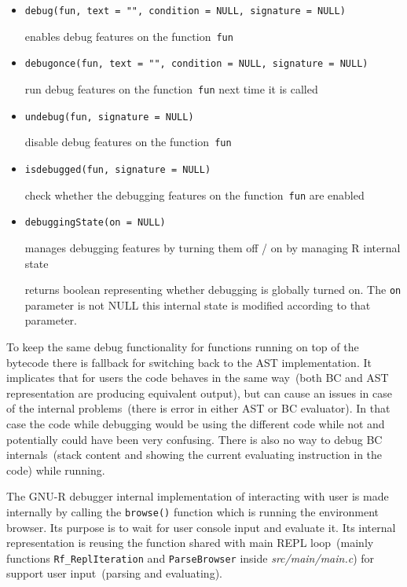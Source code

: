 \documentclass[thesis=M,english]{FITthesis}[2018/10/20]
\newcommand{\code}[1]{\texttt{#1}}
\begin{document}
\begin{itemize}
	\item \code{debug(fun, text = "", condition = NULL, signature = NULL)}

	\hspace*{6mm} enables debug features on the function~\code{fun}
	
	\item \code{debugonce(fun, text = "", condition = NULL, signature = NULL)}

	\hspace*{6mm} run debug features on the function~\code{fun} next time it is called	
	
	\item \code{undebug(fun, signature = NULL)}

	\hspace*{6mm} disable debug features on the function~\code{fun}

	\item \code{isdebugged(fun, signature = NULL)}

	\hspace*{6mm} check whether the debugging features on the function~\code{fun} are enabled

	\item \code{debuggingState(on = NULL)}

	\hspace*{6mm} manages debugging features by turning them off / on by managing R internal state
	
	\hspace*{6mm} returns boolean representing whether debugging is globally turned on. The \code{on} parameter is not NULL this internal state is modified according to that parameter.
	
\end{itemize}

To keep the same debug functionality for functions running on top of the bytecode there is fallback for switching back to the AST implementation. It implicates that for users the code behaves in the same way~(both BC and AST representation are producing equivalent output), but can cause an issues in case of the internal problems~(there is error in either AST or BC evaluator). In that case the code while debugging would be using the different code while not and potentially could have been very confusing. There is also no way to debug BC internals~(stack content and showing the current evaluating instruction in the code) while running.

The GNU-R debugger internal implementation of interacting with user is made internally by calling the \code{browse()} function which is running the environment browser. Its purpose is to wait for user console input and evaluate it. Its internal representation is reusing the function shared with main REPL loop~(mainly functions \code{Rf{\_}ReplIteration} and \code{ParseBrowser} inside \textit{src/main/main.c}) for support user input~(parsing and evaluating).
\end{document}

